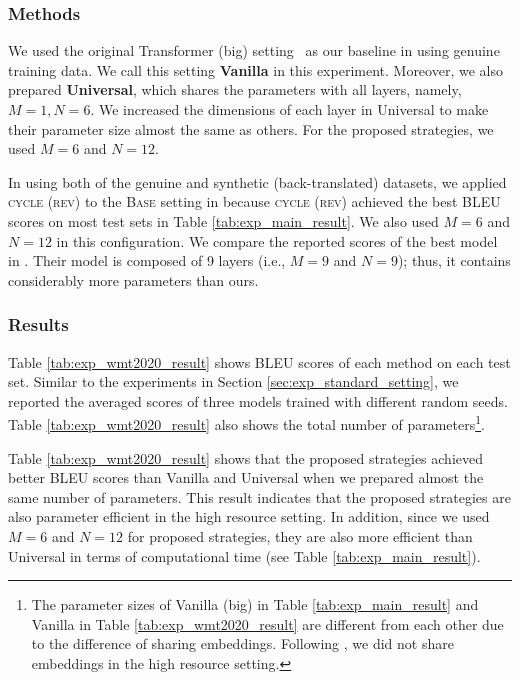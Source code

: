 \documentclass[11pt]{article}
\begin{document}
\subsubsection{Methods}
We used the original Transformer (big) setting~\cite{NIPS2017_7181} as our baseline in using genuine training data.
We call this setting \textbf{Vanilla} in this experiment.
Moreover, we also prepared \textbf{Universal}, which shares the parameters with all layers, namely, $M=1, N=6$.
We increased the dimensions of each layer in Universal to make their parameter size almost the same as others.
For the proposed strategies, we used $M = 6$ and $N = 12$.

In using both of the genuine and synthetic (back-translated) datasets, we applied \textsc{cycle (rev)} to the \textsc{Base} setting in \cite{kiyono-etal-2020-tohoku} because \textsc{cycle (rev)} achieved the best BLEU scores on most test sets in Table \ref{tab:exp_main_result}.
We also used $M = 6$ and $N = 12$ in this configuration.
We compare the reported scores of the best model in \cite{kiyono-etal-2020-tohoku}.
Their model is composed of 9 layers (i.e., $M = 9$ and $N = 9$); thus, it contains considerably more parameters than ours.


\subsubsection{Results}
Table \ref{tab:exp_wmt2020_result} shows BLEU scores of each method on each test set.
Similar to the experiments in Section \ref{sec:exp_standard_setting}, we reported the averaged scores of three models trained with different random seeds.
Table \ref{tab:exp_wmt2020_result} also shows the total number of parameters\footnote{The parameter sizes of Vanilla (big) in Table \ref{tab:exp_main_result} and Vanilla in Table \ref{tab:exp_wmt2020_result} are different from each other due to the difference of sharing embeddings. Following \cite{kiyono-etal-2020-tohoku}, we did not share embeddings in the high resource setting.}.

Table \ref{tab:exp_wmt2020_result} shows that the proposed strategies achieved better BLEU scores than Vanilla and Universal when we prepared almost the same number of parameters.
This result indicates that the proposed strategies are also parameter efficient in the high resource setting.
In addition, since we used $M = 6$ and $N = 12$ for proposed strategies, they are also more efficient than Universal in terms of computational time (see Table \ref{tab:exp_main_result}).
\end{document}
